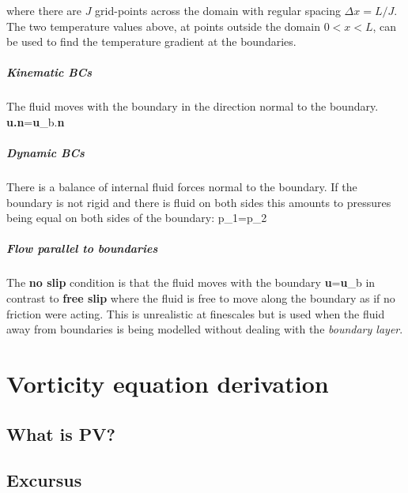 where there are $J$ grid-points across the domain with regular spacing
$\Delta x=L/J$. The two temperature values above, at points outside the
domain $0<x<L$, can be used to find the temperature gradient at the
boundaries.

\paragraph{Kinematic BCs}

The fluid moves with the boundary in the direction normal to the boundary.
\BEQ
{\bf u.n}={\bf u}_b.{\bf n}
\EEQ

\paragraph{Dynamic BCs}

There is a balance of internal fluid forces normal to the boundary. If
the boundary is not rigid and there is fluid on both sides this
amounts to pressures being equal on both sides of the boundary: 
\BEQ
p_1=p_2 
\EEQ

\paragraph{Flow parallel to boundaries}

The {\bf no slip} condition is that the fluid moves with the boundary
\BEQ
{\bf u}={\bf u}_b
\EEQ
in contrast to {\bf free slip} where the fluid is free to move along
the boundary as if no friction were acting. This is unrealistic at
finescales but is used when the fluid away from boundaries
is being modelled without dealing with the {\em boundary layer}. 

\vspace{1em} 

\newpage

\chapter{Vorticity equation derivation}

\section{What is PV?}

\section{Excursus}
